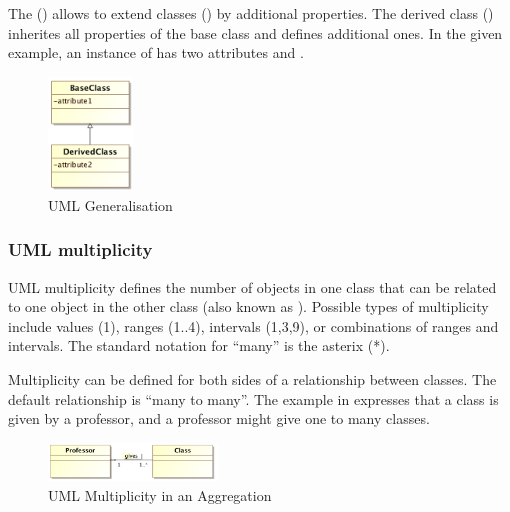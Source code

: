 The  () allows to extend classes () by additional properties. The derived class () inherites all properties of the base class and defines additional ones. In the given example, an instance of  has two attributes  and .
%
\begin{figure}[h]
\centering
\includegraphics[width=0.2\textwidth]{images/uml/umlGeneralisation.png}
\caption{UML Generalisation}
\label{fig:umlGeneralisation}
\end{figure}
%
\subsubsection{UML multiplicity}
UML multiplicity defines the number of objects in one class that can be related to one object in the other class (also known as ). Possible types of multiplicity include values (1), ranges (1$..$4), intervals (1,3,9), or combinations of ranges and intervals. The standard notation for ``many'' is the asterix (*). 

Multiplicity can be defined for both sides of a relationship between classes. The default relationship is ``many to many''. 
The example in  expresses that a class is given by a professor, and a professor might give one to many classes.
\begin{figure}[h]
\centering
\includegraphics[width=0.4\textwidth]{images/uml/umlMultiplicity.png}
\caption{UML Multiplicity in an Aggregation}
\label{fig:umlMulti}
\end{figure}

